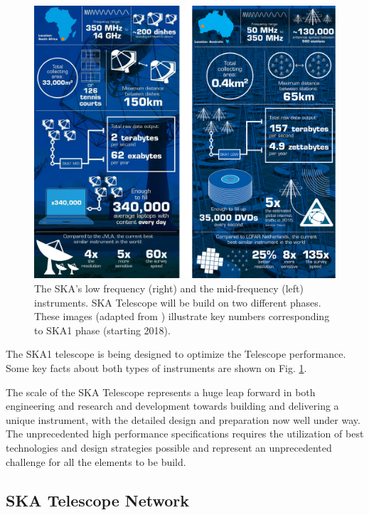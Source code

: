 \documentclass[review]{elsarticle}
\begin{document}
\begin{figure}[h]
	\includegraphics[scale=0.25]{img/ska_instruments}
	\caption{The SKA's low frequency (right) and the mid-frequency (left) instruments.  SKA Telescope will be build on two different phases. These images (adapted from \cite{ska_multimedia_fig}) illustrate key numbers corresponding to SKA1 phase (starting 2018). }
	\label{fig:ska_instruments1}
\end{figure}

The SKA1 telescope is being designed to optimize the Telescope performance. Some key facts about both types of instruments are shown on Fig. \ref{fig:ska_instruments1}. 

The scale of the SKA Telescope represents a huge leap forward in both engineering and research and development towards building and delivering a unique instrument, with the detailed design and preparation now well under way. The unprecedented high performance specifications requires the utilization of best technologies and design strategies possible and represent an unprecedented challenge for all the elements to be build. 

\subsection{SKA Telescope Network}
\end{document}
